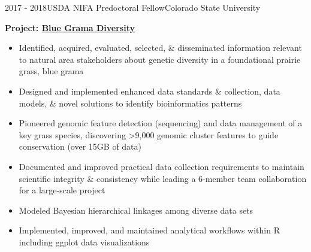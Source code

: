 \documentclass[letterpaper]{twentysecondcv} %
\begin{document}
\begin{twenty}
    
    
       \twentyitem
    	{2017 - }{2018}{USDA NIFA Predoctoral Fellow}{Colorado State University}
        	{}
	{ \vspace{-2mm}
        \textbf{Project: \textcolor{special}{\href{https://github.com/avahoffman/blue-grama-diversity}{Blue Grama Diversity}}}
        {\begin{itemize}
        \item Identified, acquired, evaluated, selected, \& disseminated information relevant to natural area stakeholders about genetic diversity in a foundational prairie grass, blue grama
        \item Designed and implemented enhanced data standards \& collection, data models, \& novel solutions to identify bioinformatics patterns 
        \item Pioneered genomic feature detection (sequencing) and data management of a key grass species, discovering >9,000 genomic cluster features to guide conservation (over 15GB of data)
        \item Documented and improved practical data collection requirements to maintain scientific integrity \& consistency while leading a 6-member team collaboration for a large-scale project 
	\item Modeled Bayesian hierarchical linkages among diverse data sets
        \item Implemented, improved, and maintained analytical workflows within R including ggplot data visualizations 


\end{itemize}}}
\end{twenty}
\end{document}
